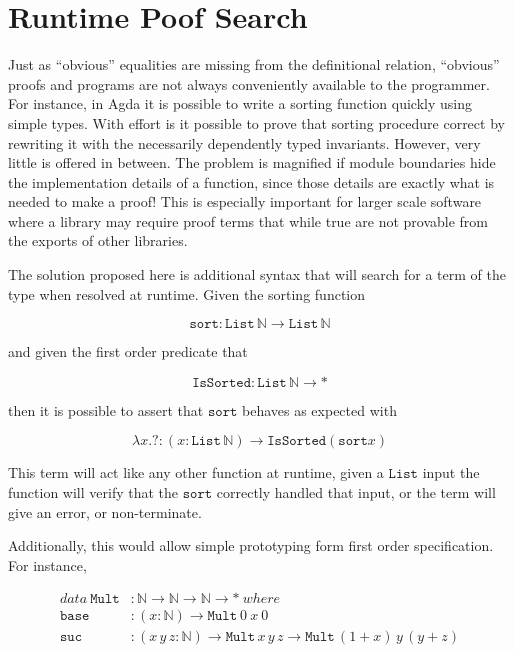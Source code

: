 
\section{Runtime Poof Search}

Just as ``obvious'' equalities are missing from the definitional
relation, ``obvious'' proofs and programs are not always conveniently
available to the programmer. For instance, in Agda it is possible
to write a sorting function quickly using simple types. With effort
is it possible to prove that sorting procedure correct by rewriting
it with the necessarily dependently typed invariants. However, very
little is offered in between. The problem is magnified if module boundaries
hide the implementation details of a function, since those details
are exactly what is needed to make a proof! This is especially important
for larger scale software where a library may require proof terms
that while true are not provable from the exports of other libraries.

The solution proposed here is additional syntax that will search for
a term of the type when resolved at runtime. Given the sorting function 

\[
\mathtt{sort}:\mathtt{List}\,\mathbb{N}\rightarrow\mathtt{List}\,\mathbb{N}
\]

and given the first order predicate that 

\[
\mathtt{IsSorted}:\mathtt{List}\,\mathbb{N}\rightarrow*
\]

then it is possible to assert that $\mathtt{sort}$ behaves as expected
with

\[
\lambda x.?:\left(x:\mathtt{List}\,\mathbb{N}\right)\rightarrow\mathtt{IsSorted}\left(\mathtt{sort}x\right)
\]

This term will act like any other function at runtime, given a $\mathtt{List}$
input the function will verify that the $\mathtt{sort}$ correctly
handled that input, or the term will give an error, or non-terminate.

Additionally, this would allow simple prototyping form first order
specification. For instance,

\begin{align*}
data\ \mathtt{Mult} & :\mathbb{N}\rightarrow\mathbb{N}\rightarrow\mathbb{N}\rightarrow*\ where\\
\mathtt{base} & :\left(x:\mathbb{N}\right)\rightarrow\mathtt{Mult}\ 0\ x\ 0\\
\mathtt{suc} & :\left(x\,y\,z:\mathbb{N}\right)\rightarrow\mathtt{Mult}\,x\,y\,z\rightarrow\mathtt{Mult}\,\left(1+x\right)\,y\,(y+z)
\end{align*}


